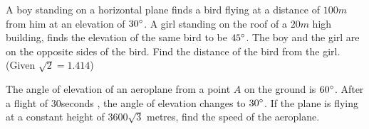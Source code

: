 \item A boy standing on a horizontal plane finds a bird flying at a distance of $100 m$ from him at an elevation of $30\degree$. A girl standing on the roof of a $20 m$ high building, finds the elevation of the same bird to be $45\degree$. The boy and the girl are on the opposite sides of the bird. Find the distance of the bird from the girl. (Given ${\sqrt 2}= 1.414$)

\hfill{}\item The angle of elevation of an aeroplane from a point $A$ on the ground is $60\degree$. After a flight of $30 $seconds , the angle of elevation changes to $30\degree$. If the plane is flying at a constant height of $3600\sqrt 3 $ metres, find the speed of the aeroplane.

\hfill{}
